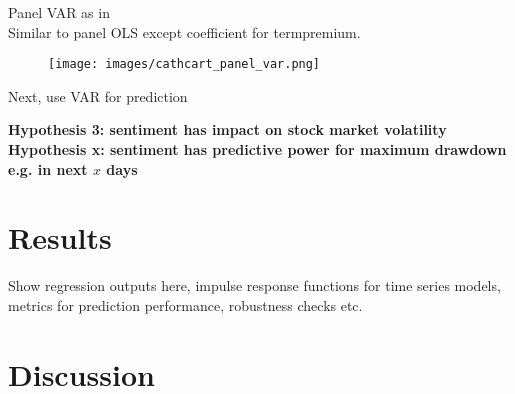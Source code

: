 \newpage
\noindent
Panel VAR as in \cite{cathcart2020}\\
Similar to panel OLS except coefficient for termpremium.

\begin{figure}[h]
\texttt{[image: images/cathcart\_panel\_var.png]}
\end{figure}

Next, use VAR for prediction

\newpage

\noindent
\textbf{Hypothesis 3: sentiment has impact on stock market volatility}
\cite{audrino2020} \\

\noindent
\textbf{Hypothesis x: sentiment has predictive power for maximum drawdown e.g. in next $x$ days}
\cite{audrino2020}



\section{Results}

Show regression outputs here, impulse response functions for time series models, metrics for prediction performance, robustness checks etc.

\section{Discussion}





\cleardoublepage
